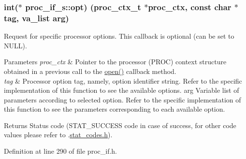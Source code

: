 \subsubsection[{\texorpdfstring{opt}{opt}}]{\setlength{\rightskip}{0pt plus 5cm}int($\ast$ proc\+\_\+if\+\_\+s\+::opt) ({\bf proc\+\_\+ctx\+\_\+t} $\ast$proc\+\_\+ctx, const char $\ast$tag, va\+\_\+list arg)}\hypertarget{structproc__if__s_a4ca0939d6721f368d2560851197fca36}{}\label{structproc__if__s_a4ca0939d6721f368d2560851197fca36}
Request for specific processor options. This callback is optional (can be set to N\+U\+LL). 
\begin{DoxyParams}{Parameters}
{\em proc\+\_\+ctx} & Pointer to the processor (P\+R\+OC) context structure obtained in a previous call to the \textquotesingle{}\hyperlink{structproc__if__s_a34999576771394dfb721463c8455ba06}{open()}\textquotesingle{} callback method. \\
\hline
{\em tag} & Processor option tag, namely, option identifier string. Refer to the specific implementation of this function to see the available options. arg Variable list of parameters according to selected option. Refer to the specific implementation of this function to see the parameters corresponding to each available option. \\
\hline
\end{DoxyParams}
\begin{DoxyReturn}{Returns}
Status code (S\+T\+A\+T\+\_\+\+S\+U\+C\+C\+E\+SS code in case of success, for other code values please refer to .\hyperlink{stat__codes_8h}{stat\+\_\+codes.\+h}). 
\end{DoxyReturn}


Definition at line 290 of file proc\+\_\+if.\+h.


